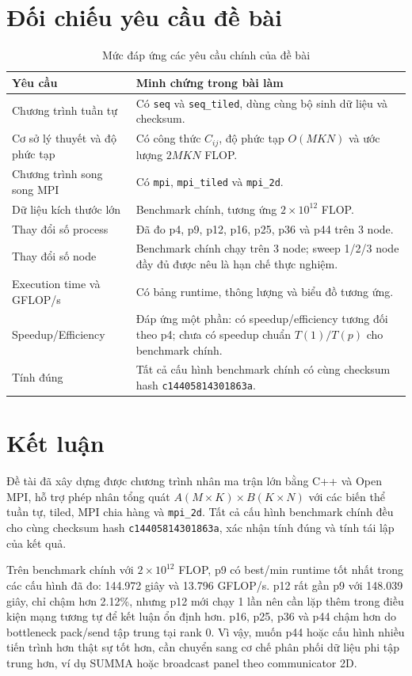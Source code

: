 \documentclass[12pt,a4paper]{article}
\newcommand{\code}[1]{\texttt{#1}}
\begin{document}
\section{Đối chiếu yêu cầu đề bài}
\begin{table}[H]
\centering
\caption{Mức đáp ứng các yêu cầu chính của đề bài}
\small
\begin{tabularx}{\textwidth}{lX}
\toprule
Yêu cầu & Minh chứng trong bài làm \\
\midrule
Chương trình tuần tự & Có \code{seq} và \code{seq\_tiled}, dùng cùng bộ sinh dữ liệu và checksum. \\
Cơ sở lý thuyết và độ phức tạp & Có công thức $C_{ij}$, độ phức tạp $O(MKN)$ và ước lượng $2MKN$ FLOP. \\
Chương trình song song MPI & Có \code{mpi}, \code{mpi\_tiled} và \code{mpi\_2d}. \\
Dữ liệu kích thước lớn & Benchmark chính, tương ứng $2\times10^{12}$ FLOP. \\
Thay đổi số process & Đã đo p4, p9, p12, p16, p25, p36 và p44 trên 3 node. \\
Thay đổi số node & Benchmark chính chạy trên 3 node; sweep 1/2/3 node đầy đủ được nêu là hạn chế thực nghiệm. \\
Execution time và GFLOP/s & Có bảng runtime, thông lượng và biểu đồ tương ứng. \\
Speedup/Efficiency & Đáp ứng một phần: có speedup/efficiency tương đối theo p4; chưa có speedup chuẩn $T(1)/T(p)$ cho benchmark chính. \\
Tính đúng & Tất cả cấu hình benchmark chính có cùng checksum hash \code{c14405814301863a}. \\
\bottomrule
\end{tabularx}
\end{table}

\section{Kết luận}
Đề tài đã xây dựng được chương trình nhân ma trận lớn bằng C++ và Open MPI, hỗ trợ phép nhân tổng quát $A(M \times K) \times B(K \times N)$ với các biến thể tuần tự, tiled, MPI chia hàng và \code{mpi\_2d}. Tất cả cấu hình benchmark chính đều cho cùng checksum hash \code{c14405814301863a}, xác nhận tính đúng và tính tái lập của kết quả.

Trên benchmark chính với $2 \times 10^{12}$ FLOP, p9 có best/min runtime tốt nhất trong các cấu hình đã đo: 144.972 giây và 13.796 GFLOP/s. p12 rất gần p9 với 148.039 giây, chỉ chậm hơn 2.12\%, nhưng p12 mới chạy 1 lần nên cần lặp thêm trong điều kiện mạng tương tự để kết luận ổn định hơn. p16, p25, p36 và p44 chậm hơn do bottleneck pack/send tập trung tại rank 0. Vì vậy, muốn p44 hoặc cấu hình nhiều tiến trình hơn thật sự tốt hơn, cần chuyển sang cơ chế phân phối dữ liệu phi tập trung hơn, ví dụ SUMMA hoặc broadcast panel theo communicator 2D.
\end{document}
